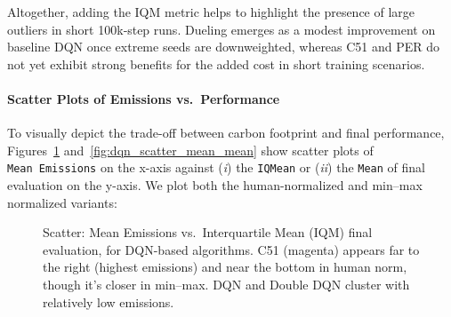 Altogether, adding the IQM metric helps to highlight the presence of large outliers
in short 100k‐step runs. Dueling emerges as a modest improvement on baseline DQN
once extreme seeds are downweighted, whereas C51 and PER do not yet exhibit 
strong benefits for the added cost in short training scenarios.


\paragraph{Scatter Plots of Emissions vs.\ Performance}
To visually depict the trade-off between carbon footprint and final performance,
Figures~\ref{fig:dqn_scatter_mean_iqm} and~\ref{fig:dqn_scatter_mean_mean} 
show scatter plots of \texttt{Mean~Emissions} on the x-axis against 
(\emph{i}) the \texttt{IQMean} or 
(\emph{ii}) the \texttt{Mean} of final evaluation on the y-axis. 
We plot both the human-normalized and min--max normalized variants:

\begin{figure}
	\centering
	\quad
	\caption{Scatter: Mean Emissions vs.\ Interquartile Mean (IQM) final evaluation, for DQN-based algorithms. 
		C51 (magenta) appears far to the right (highest emissions) 
		and near the bottom in human norm, though it’s closer in min--max. 
		DQN and Double DQN cluster with relatively low emissions.}
	\label{fig:dqn_scatter_mean_iqm}
\end{figure}

